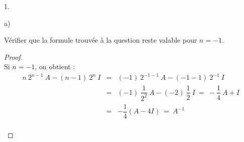 \begin{noliste}{1.}
\begin{noliste}{a)}
  \item Vérifier que la formule trouvée à la question  reste
    valable pour $n = -1$.

    \begin{proof}~\\
      Si $n=-1$, on obtient :
      \[
      \begin{array}{rcl}
        n \ 2^{n-1} \ A - (n-1) \ 2^n \ I & = & (-1)\ 2^{-1-1}\ A - (-1-1)\
        2^{-1}\ I 
        \\[.2cm]
        & = & (-1) \ \dfrac{1}{2^2} \ A - (-2) \ \dfrac{1}{2} \ I \ = \ 
        -\dfrac{1}{4} \ A + I 
        \\[.2cm]
        & = & -\dfrac{1}{4} (A - 4I) \ = \ A^{-1}
      \end{array}
      \]
      ~\\[-1.2cm]
    \end{proof}
  \end{noliste}
\end{noliste}


\newpage


